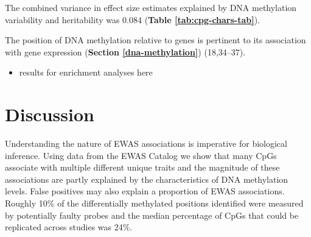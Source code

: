 \documentclass[11pt,oneside]{bristolthesis}
\providecommand{\tightlist}{%
  \setlength{\itemsep}{0pt}\setlength{\parskip}{0pt}}
\begin{document}
The combined variance in effect size estimates explained by DNA methylation variability and heritability was 0.084 (\textbf{Table \ref{tab:cpg-chars-tab}}). \linebreak
\begin{table}[!h]

\caption{\label{tab:cpg-chars-tab}Association between CpG chars and associations in EWAS}
\centering
{}
\end{table}
\linebreak

The position of DNA methylation relative to genes is pertinent to its association with gene expression (\textbf{Section \ref{dna-methylation}}) (18,34--37).
\begin{itemize}
\tightlist
\item
  results for enrichment analyses here
\end{itemize}
\newpage

\hypertarget{discussion-04}{%
\section{Discussion}\label{discussion-04}}

Understanding the nature of EWAS associations is imperative for biological inference. Using data from the EWAS Catalog we show that many CpGs associate with multiple different unique traits and the magnitude of these associations are partly explained by the characteristics of DNA methylation levels. False positives may also explain a proportion of EWAS associations. Roughly 10\% of the differentially methylated positions identified were measured by potentially faulty probes and the median percentage of CpGs that could be replicated across studies was 24\%.
\end{document}

